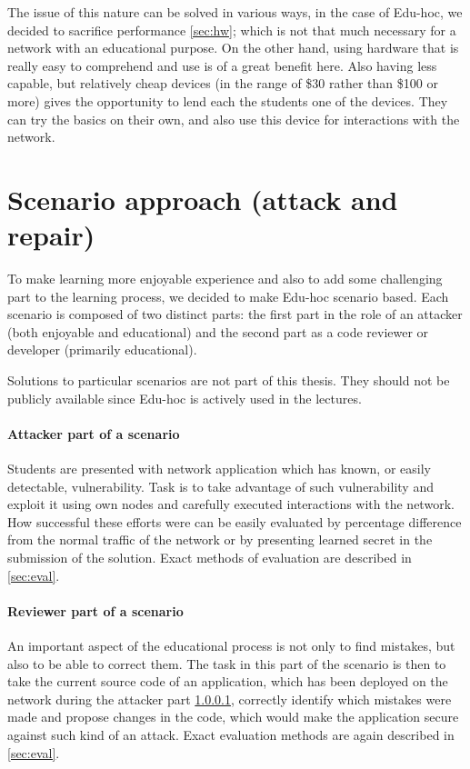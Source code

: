 \documentclass[
  print, %
  Table,   %
  nolof,     %
  nolot,     %
           oneside
]{fithesis3}
\begin{document}
  The issue of this nature can be solved in various ways, in the case of Edu-hoc, we decided to sacrifice performance \ref{sec:hw}; which is not that much necessary for a network with an educational purpose. On the other hand, using hardware that is really easy to comprehend and use is of a great benefit here. Also having less capable, but relatively cheap devices (in the range of \$30 rather than \$100 or more) gives the opportunity to lend each the students one of the devices. They can try the basics on their own, and also use this device for interactions with the network.

  \section{Scenario approach (attack and repair)}
  To make learning more enjoyable experience and also to add some challenging part to the learning process, we decided to make Edu-hoc scenario based. Each scenario is composed of two distinct parts: the first part in the role of an attacker (both enjoyable and educational) and the second part as a code reviewer or developer (primarily educational).

  Solutions to particular scenarios are not part of this thesis. They should not be publicly available since Edu-hoc is actively used in the lectures.

  \paragraph{Attacker part of a scenario}\label{par:att}
    Students are presented with network application which has known, or easily detectable, vulnerability. Task is to take advantage of such vulnerability and exploit it using own nodes and carefully executed interactions with the network. How successful these efforts were can be easily evaluated by percentage difference from the normal traffic of the network or by presenting learned secret in the submission of the solution. Exact methods of evaluation are described in \ref{sec:eval}.

  \paragraph{Reviewer part of a scenario}
    An important aspect of the educational process is not only to find mistakes, but also to be able to correct them. The task in this part of the scenario is then to take the current source code of an application, which has been deployed on the network during the attacker part \ref{par:att}, correctly identify which mistakes were made and propose changes in the code, which would make the application secure against such kind of an attack. Exact evaluation methods are again described in \ref{sec:eval}.
\end{document}
